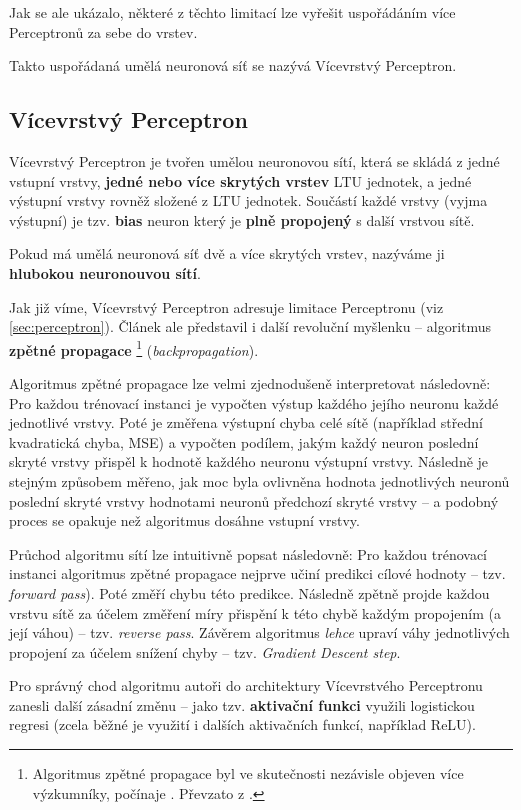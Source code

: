 Jak se ale ukázalo, některé z těchto limitací lze vyřešit uspořádáním více Perceptronů za sebe do vrstev. \cite{Rumelhart1987}

Takto uspořádaná umělá neuronová síť se nazývá Vícevrstvý Perceptron.

\subsection{Vícevrstvý Perceptron}
Vícevrstvý Perceptron je tvořen umělou neuronovou sítí, která se skládá z jedné vstupní vrstvy, \textbf{jedné nebo více skrytých vrstev} LTU jednotek, a jedné výstupní vrstvy rovněž složené z LTU jednotek.
Součástí každé vrstvy (vyjma výstupní) je tzv. \textbf{bias} neuron který je \textbf{plně propojený} s další vrstvou sítě. \cite{Geron2019}

Pokud má umělá neuronová síť dvě a více skrytých vrstev, nazýváme ji \textbf{hlubokou neuronouvou sítí}.

Jak již víme, Vícevrstvý Perceptron adresuje limitace Perceptronu (viz \autoref{sec:perceptron}).
Článek \cite{Rumelhart1987} ale představil i další revoluční myšlenku – algoritmus \textbf{zpětné propagace}
\footnote{Algoritmus zpětné propagace byl ve skutečnosti nezávisle objeven více výzkumníky, počínaje \cite{Werbos1974}. Převzato z \cite{Geron2019}.} (\emph{backpropagation}).

Algoritmus zpětné propagace lze velmi zjednodušeně interpretovat následovně: Pro každou trénovací instanci je vypočten výstup každého jejího neuronu každé jednotlivé vrstvy.
Poté je změřena výstupní chyba celé sítě (například střední kvadratická chyba, MSE) a vypočten podílem, jakým každý neuron poslední skryté vrstvy přispěl k hodnotě každého neuronu výstupní vrstvy.
Následně je stejným způsobem měřeno, jak moc byla ovlivněna hodnota jednotlivých neuronů poslední skryté vrstvy hodnotami neuronů předchozí skryté vrstvy – a podobný proces se opakuje než algoritmus dosáhne vstupní vrstvy. \cite{Geron2019}

Průchod algoritmu sítí lze intuitivně popsat následovně: Pro každou trénovací instanci algoritmus zpětné propagace nejprve učiní predikci cílové hodnoty – tzv. \emph{forward pass}).
Poté změří chybu této predikce. Následně zpětně projde každou vrstvu sítě za účelem změření míry přispění k této chybě každým propojením (a její váhou) – tzv. \emph{reverse pass}.
Závěrem algoritmus \emph{lehce} upraví váhy jednotlivých propojení za účelem snížení chyby – tzv. \emph{Gradient Descent step}. \cite{Geron2019}

Pro správný chod algoritmu autoři \cite{Rumelhart1987} do architektury Vícevrstvého Perceptronu zanesli další zásadní změnu – jako tzv. \textbf{aktivační funkci} využili logistickou regresi (zcela běžné je využití i dalších aktivačních funkcí, například ReLU).